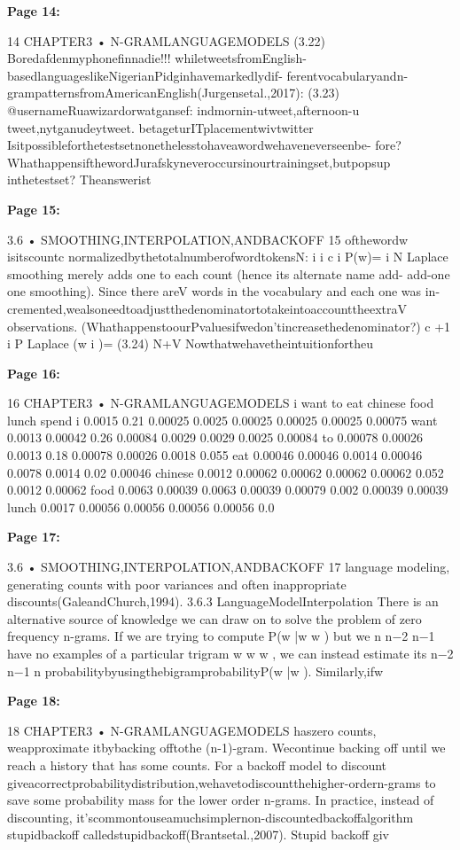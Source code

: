 \documentclass[11pt,a4paper]{article}
\begin{document}
\textbf{Page 14:}

14 CHAPTER3 • N-GRAMLANGUAGEMODELS
(3.22) Boredafdenmyphonefinnadie!!!
whiletweetsfromEnglish-basedlanguageslikeNigerianPidginhavemarkedlydif-
ferentvocabularyandn-grampatternsfromAmericanEnglish(Jurgensetal.,2017):
(3.23) @usernameRuawizardorwatgansef: indmornin-utweet,afternoon-u
tweet,nytganudeytweet. betageturITplacementwivtwitter
Isitpossibleforthetestsetnonethelesstohaveawordwehaveneverseenbe-
fore?WhathappensifthewordJurafskyneveroccursinourtrainingset,butpopsup
inthetestset? Theanswerist

\textbf{Page 15:}

3.6 • SMOOTHING,INTERPOLATION,ANDBACKOFF 15
ofthewordw isitscountc normalizedbythetotalnumberofwordtokensN:
i i
c
i
P(w)=
i
N
Laplace smoothing merely adds one to each count (hence its alternate name add-
add-one one smoothing). Since there areV words in the vocabulary and each one was in-
cremented,wealsoneedtoadjustthedenominatortotakeintoaccounttheextraV
observations. (WhathappenstoourPvaluesifwedon’tincreasethedenominator?)
c +1
i
P Laplace (w i )= (3.24)
N+V
Nowthatwehavetheintuitionfortheu

\textbf{Page 16:}

16 CHAPTER3 • N-GRAMLANGUAGEMODELS
i want to eat chinese food lunch spend
i 0.0015 0.21 0.00025 0.0025 0.00025 0.00025 0.00025 0.00075
want 0.0013 0.00042 0.26 0.00084 0.0029 0.0029 0.0025 0.00084
to 0.00078 0.00026 0.0013 0.18 0.00078 0.00026 0.0018 0.055
eat 0.00046 0.00046 0.0014 0.00046 0.0078 0.0014 0.02 0.00046
chinese 0.0012 0.00062 0.00062 0.00062 0.00062 0.052 0.0012 0.00062
food 0.0063 0.00039 0.0063 0.00039 0.00079 0.002 0.00039 0.00039
lunch 0.0017 0.00056 0.00056 0.00056 0.00056 0.0

\textbf{Page 17:}

3.6 • SMOOTHING,INTERPOLATION,ANDBACKOFF 17
language modeling, generating counts with poor variances and often inappropriate
discounts(GaleandChurch,1994).
3.6.3 LanguageModelInterpolation
There is an alternative source of knowledge we can draw on to solve the problem
of zero frequency n-grams. If we are trying to compute P(w |w w ) but we
n n−2 n−1
have no examples of a particular trigram w w w , we can instead estimate its
n−2 n−1 n
probabilitybyusingthebigramprobabilityP(w |w ). Similarly,ifw

\textbf{Page 18:}

18 CHAPTER3 • N-GRAMLANGUAGEMODELS
haszero counts, weapproximate itbybacking offtothe (n-1)-gram. Wecontinue
backing off until we reach a history that has some counts. For a backoff model to
discount giveacorrectprobabilitydistribution,wehavetodiscountthehigher-ordern-grams
to save some probability mass for the lower order n-grams. In practice, instead of
discounting, it’scommontouseamuchsimplernon-discountedbackoffalgorithm
stupidbackoff calledstupidbackoff(Brantsetal.,2007).
Stupid backoff giv
\end{document}
